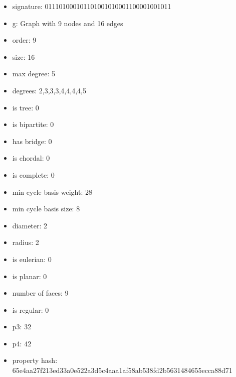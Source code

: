 \newpage
\begin{figure}
\end{figure}
\begin{itemize}
\item signature: 011101000101101001010001100001001011
\item g: Graph with 9 nodes and 16 edges
\item order: 9
\item size: 16
\item max degree: 5
\item degrees: 2,3,3,3,4,4,4,4,5
\item is tree: 0
\item is bipartite: 0
\item has bridge: 0
\item is chordal: 0
\item is complete: 0
\item min cycle basis weight: 28
\item min cycle basis size: 8
\item diameter: 2
\item radius: 2
\item is eulerian: 0
\item is planar: 0
\item number of faces: 9
\item is regular: 0
\item p3: 32
\item p4: 42
\item property hash: 65e4aa27f213ed33a0e522a3d5c4aaa1af58ab538fd2b5631484655ecca88d71
\end{itemize}
